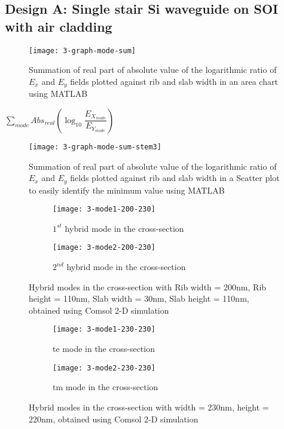 \documentclass[../report.tex]{subfiles}
\begin{document}
		\subsection{Design A: Single stair Si waveguide on SOI with air cladding}

\begin{figure}[H] %
	\centering
	\texttt{[image: 3-graph-mode-sum]}
	\caption{Summation of real part of absolute value of the logarithmic ratio of $E_x$ and $E_y$ fields plotted against rib and slab width in an area chart using MATLAB}
	\label{fig:3_graph_mode_sum}
\end{figure}

$\sum _{mode}Abs_{real}\left( \log _{10}\dfrac {E_{X_{mode}}} {E_{Y_{mode}}}\right) $

\begin{figure}[H] %
	\centering
	\texttt{[image: 3-graph-mode-sum-stem3]}
	\caption{Summation of real part of absolute value of the logarithmic ratio of $E_x$ and $E_y$ fields plotted against rib and slab width in a Scatter plot to easily identify the minimum value using MATLAB}
	\label{fig:3_graph_mode_sum_stem3}
\end{figure}



\begin{figure}[H] %
	\begin{subfigure}[t]{0.45\textwidth}
		\texttt{[image: 3-mode1-200-230]}
		\caption{$1^{st}$ hybrid mode in the cross-section}
		\label{fig:3_mode1_200_230}
	\end{subfigure}
	\hfill
	\begin{subfigure}[t]{0.45\textwidth}
		\texttt{[image: 3-mode2-200-230]}
		\caption{$2^{nd}$ hybrid mode in the cross-section}
		\label{fig:3_mode2_200_230}
	\end{subfigure}
	\caption{Hybrid modes in the cross-section with Rib width = 200nm, Rib height = 110nm, Slab width = 30nm, Slab height = 110nm, obtained using Comsol 2-D simulation}
\end{figure}

\begin{figure}[H] %
	\begin{subfigure}[t]{0.45\textwidth}
		\texttt{[image: 3-mode1-230-230]}
		\caption{\gls{te} mode in the cross-section}
		\label{fig:3_mode1_230_230}
	\end{subfigure}
	\hfill
	\begin{subfigure}[t]{0.45\textwidth}
		\texttt{[image: 3-mode2-230-230]}
		\caption{\gls{tm} mode in the cross-section}
		\label{fig:3_mode2_230_230}
	\end{subfigure}
	\caption{Hybrid modes in the cross-section with width = 230nm, height = 220nm, obtained using Comsol 2-D simulation}
\end{figure}
\end{document}
